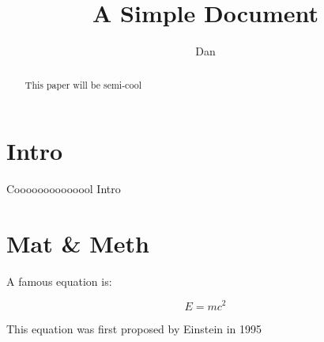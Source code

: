 \documentclass[12pt]{article}
\title{A Simple Document}
\author{Dan}
\date{}
\begin{document}
	\maketitle
	
	\begin{abstract}
		This paper will be semi-cool
	\end{abstract}

	\section{Intro}
	Coooooooooooool Intro
	
	\section{Mat \& Meth}
	A famous equation is:
	
	\begin{equation}
		E = mc^2
	\end{equation}
	
	This equation was first proposed by Einstein in 1995 \cite{einstein1905does}
	
	
	
\end{document}
